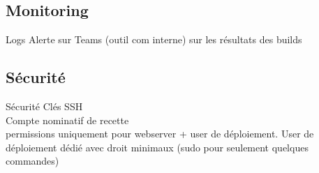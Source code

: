 \subsection{Monitoring}
\begin{frame}{\subsecname}
	Logs
	Alerte sur Teams (outil com interne) sur les résultats des builds
\end{frame}

\subsection{Sécurité}
\begin{frame}{Sécurité}
	Clés SSH  \\
	Compte nominatif de recette \\
	permissions uniquement pour webserver + user de déploiement. 
	User de déploiement dédié avec droit minimaux (sudo pour seulement quelques commandes)
\end{frame}
